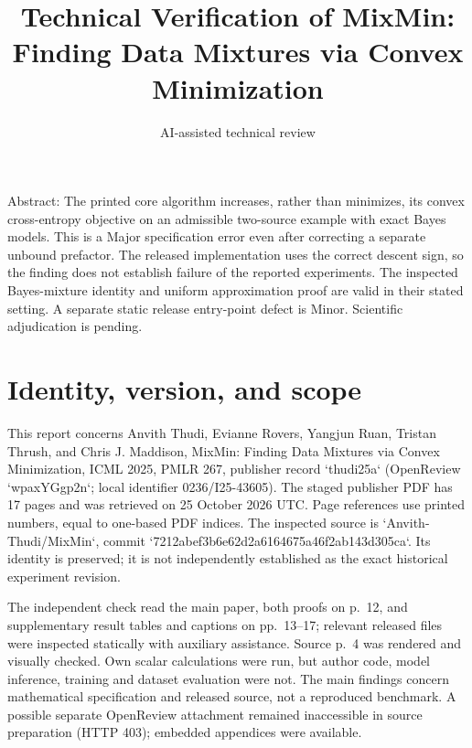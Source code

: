 \documentclass[10pt]{article}
\title{Technical Verification of
MixMin: Finding Data Mixtures via Convex Minimization}
\author{AI-assisted technical review}
\date{}
\begin{document}
\maketitle
Abstract: The printed core algorithm increases, rather than minimizes, its convex cross-entropy objective on an admissible two-source example with exact Bayes models. This is a Major specification error even after correcting a separate unbound prefactor. The released implementation uses the correct descent sign, so the finding does not establish failure of the reported experiments. The inspected Bayes-mixture identity and uniform approximation proof are valid in their stated setting. A separate static release entry-point defect is Minor. Scientific adjudication is pending.\par
\section*{Identity, version, and scope}
This report concerns Anvith Thudi, Evianne Rovers, Yangjun Ruan, Tristan Thrush, and Chris J. Maddison, MixMin: Finding Data Mixtures via Convex Minimization, ICML 2025, PMLR 267, publisher record `thudi25a` (OpenReview `wpaxYGgp2n`; local identifier 0236/I25-43605). The staged publisher PDF has 17 pages and was retrieved on 25 October 2026 UTC. Page references use printed numbers, equal to one-based PDF indices. The inspected source is `Anvith-Thudi/MixMin`, commit `7212abef3b6e62d2a6164675a46f2ab143d305ca`. Its identity is preserved; it is not independently established as the exact historical experiment revision.\par
The independent check read the main paper, both proofs on p. 12, and supplementary result tables and captions on pp. 13–17; relevant released files were inspected statically with auxiliary assistance. Source p. 4 was rendered and visually checked. Own scalar calculations were run, but author code, model inference, training and dataset evaluation were not. The main findings concern mathematical specification and released source, not a reproduced benchmark. A possible separate OpenReview attachment remained inaccessible in source preparation (HTTP 403); embedded appendices were available.\par
\end{document}

